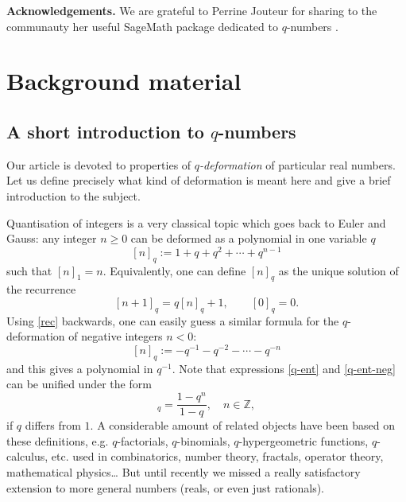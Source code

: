 \documentclass[11pt,reqno]{amsart}
\theoremstyle{plain}
\theoremstyle{definition}
\numberwithin{figure}{section}
\numberwithin{table}{section}
\numberwithin{equation}{section}
\newcommand{\Z}{\mathbb{Z}}
\begin{document}
\medbreak \noindent
\textbf{Acknowledgements.} 
We are grateful to Perrine Jouteur for sharing to the communauty her useful SageMath package dedicated to $q$-numbers \cite{JouteurSage}.






\section{Background material}\label{sec-background}

\subsection{A short introduction to $q$-numbers} \label{sec-qreals}

Our article is devoted to properties of \emph{$q$-deformation} of particular real numbers. Let us define precisely what kind of deformation is meant here and give a brief introduction to the subject.


Quantisation of integers is a very classical topic which goes back to Euler and Gauss:  any integer $n≥0$ can be deformed as a polynomial in one variable $q$
\begin{equation}\label{q-ent}
[n]_q:=1+q+q^2+\cdots+q^{n-1}
\end{equation}
such that $[n]_1=n$. Equivalently, one can define $[n]_q$ as the unique solution of the recurrence 
\begin{equation}\label{rec}
[n+1]_q=q[n]_q+1,\qquad [0]_q=0.
\end{equation}
Using \eqref{rec} backwards, one can easily guess  a similar formula for the $q$-deformation of negative integers $n<0$:
\begin{equation}\label{q-ent-neg}
[n]_q:= -q^{-1}-q^{-2}-\cdots -q^{-n}
\end{equation}
and this gives a polynomial in $q^{-1}$. Note that expressions \eqref{q-ent} and \eqref{q-ent-neg} can be unified under the form
\begin{equation*}
[n]_q=\frac{1-q^n}{1-q}, \quad n\in\Z,
\end{equation*}
if $q$ differs from $1$.
A considerable amount of related objects have been based on these definitions, e.g. $q$-factorials, $q$-binomials, $q$-hypergeometric functions, $q$-calculus, etc. used in combinatorics, number theory, fractals, operator theory, mathematical physics… But until recently we missed a really satisfactory extension to more general numbers (reals, or even just rationals).
\end{document}
